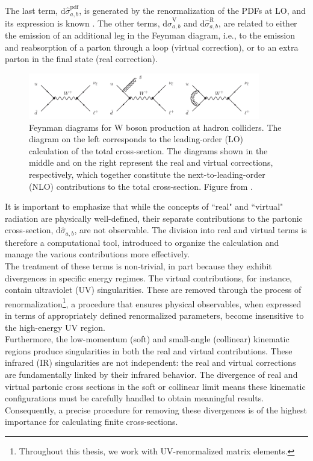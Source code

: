 \documentclass[a4paper, 12pt]{book}
\begin{document}
The last term, $\mathrm{d} \hat{\sigma}_{a,b}^{\mathrm{pdf}}$, is generated by the renormalization of the PDFs at LO, and its expression is known \cite{Catani:1996vz}. The other terms, $\mathrm{d} \hat{\sigma}_{a,b}^{\mathrm{V}}$ and $\mathrm{d} \hat{\sigma}_{a,b}^{\mathrm{R}}$, are related to either the emission of an additional leg in the Feynman diagram, i.e., to the emission and reabsorption of a parton through a loop (virtual correction), or to an extra parton in the final state (real correction).\par\bigskip
\begin{figure}[!ht]
	\centering
	\includegraphics[width=0.9\textwidth]{imgs/real-and-virtual.png}
	\caption{Feynman diagrams for W boson production at hadron colliders. The diagram on the left corresponds to the leading-order (LO) calculation of the total cross-section. The diagrams shown in the middle and on the right represent the real and virtual corrections, respectively, which together constitute the next-to-leading-order (NLO) contributions to the total cross-section. Figure from \cite{Campbell:2017}.}
	\label{hadron-collision}
\end{figure}
It is important to emphasize that while the concepts of ``real" and ``virtual" radiation are physically well-defined, their separate contributions to the partonic cross-section, $\mathrm{d}\hat{\sigma}_{a,b}$, are not observable. The division into real and virtual terms is therefore a computational tool, introduced to organize the calculation and manage the various contributions more effectively. \\ The treatment of these terms is non-trivial, in part because they exhibit divergences in specific energy regimes. The virtual contributions, for instance, contain ultraviolet (UV) singularities. These are removed through the process of renormalization\footnote{Throughout this thesis, we work with UV-renormalized matrix elements.}, a procedure that ensures physical observables, when expressed in terms of appropriately defined renormalized parameters, become insensitive to the high-energy UV region. \\ Furthermore, the low-momentum (soft) and small-angle (collinear) kinematic regions produce singularities in both the real and virtual contributions. These infrared (IR) singularities are not independent: the real and virtual corrections are fundamentally linked by their infrared behavior. The divergence of real and virtual partonic cross sections in the soft or collinear limit means these kinematic configurations must be carefully handled to obtain meaningful results. Consequently, a precise procedure for removing these divergences is of the highest importance for calculating finite cross-sections.
\end{document}
